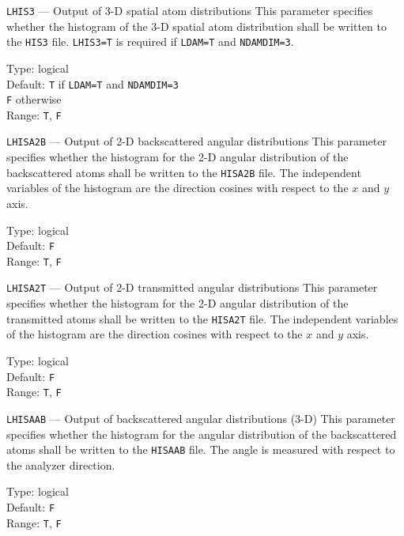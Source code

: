 \begin{keydescription}{\texttt{LHIS3} --- Output of 3-D spatial atom distributions}
%
  This parameter specifies whether the histogram of the 3-D spatial atom
  distribution shall be written to the \texttt{HIS3} file. \texttt{LHIS3=T} is
  required if \texttt{LDAM=T} and \texttt{NDAMDIM=3}.
  \begin{keytab}
    Type:    \> logical \\
    Default: \> \texttt{T} if \texttt{LDAM=T} and \texttt{NDAMDIM=3} \\
             \> \texttt{F} otherwise \\
    Range:   \> \texttt{T}, \texttt{F} 
  \end{keytab}
\end{keydescription}

\begin{keydescription}{\texttt{LHISA2B} --- Output of 2-D backscattered angular distributions}
%
  This parameter specifies whether the histogram for the 2-D angular
  distribution of the backscattered atoms shall be written to the
  \texttt{HISA2B} file. The independent variables of the histogram are the
  direction cosines with respect to the $x$ and $y$ axis.
  \begin{keytab}
    Type:    \> logical \\
    Default: \> \texttt{F} \\
    Range:   \> \texttt{T}, \texttt{F} 
  \end{keytab}
\end{keydescription}

\begin{keydescription}{\texttt{LHISA2T} --- Output of 2-D transmitted angular distributions}
%
  This parameter specifies whether the histogram for the 2-D angular
  distribution of the transmitted atoms shall be written to the
  \texttt{HISA2T} file. The independent variables of the histogram are the
  direction cosines with respect to the $x$ and $y$ axis.
  \begin{keytab}
    Type:    \> logical \\
    Default: \> \texttt{F} \\
    Range:   \> \texttt{T}, \texttt{F} 
  \end{keytab}
\end{keydescription}

\begin{keydescription}{\texttt{LHISAAB} --- Output of backscattered angular distributions (3-D)}
%
  This parameter specifies whether the histogram for the angular distribution of the 
  backscattered atoms shall be written to the \texttt{HISAAB} file. The angle is measured
  with respect to the analyzer direction.
  \begin{keytab}
    Type:    \> logical \\
    Default: \> \texttt{F} \\
    Range:   \> \texttt{T}, \texttt{F} 
  \end{keytab}
\end{keydescription}

